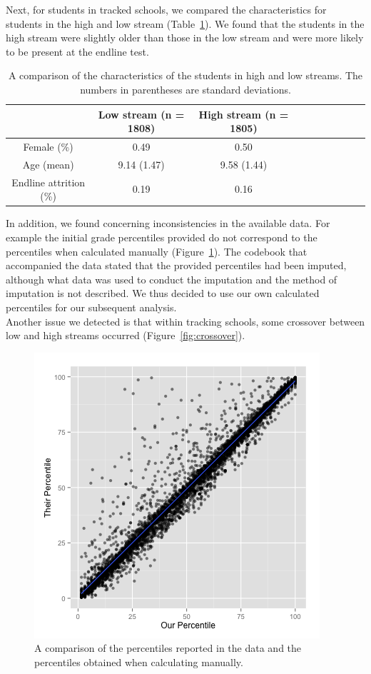 \documentclass[11pt]{article}
\begin{document}
 
 \noindent Next, for students in tracked schools, we compared the characteristics for students in the high and low stream (Table~\ref{tab:charstream}). We found that the students in the high stream were slightly older than those in the low stream and were more likely to be present at the endline test.
  \begin{table}[H]
 \centering
 \begin{tabular}{cccccccccc}
 \hline
 & Low stream (n = 1808) & High stream (n = 1805)\\
 \hline
Female (\%) & 0.49 & 0.50\\
Age (mean) & 9.14 (1.47) & 9.58 (1.44)\\
Endline attrition (\%) & 0.19 & 0.16\\ \hline
 \end{tabular}
 \caption{A comparison of the characteristics of the students in high and low streams. The numbers in parentheses are standard deviations.}
 \label{tab:charstream}
 \end{table} 
 
 
 \noindent In addition, we found concerning inconsistencies in the available data. For example the initial grade percentiles provided do not correspond to the percentiles when calculated manually (Figure~\ref{fig:percentile}). The codebook that accompanied the data stated that the provided percentiles had been imputed, although what data was used to conduct the imputation and the method of imputation is not described. We thus decided to use our own calculated percentiles for our subsequent analysis.\\
 
Another issue we detected is that within tracking schools, some crossover between low and high streams occurred (Figure~\ref{fig:crossover}).

 
 
  \begin{figure}[H]
 \centering
 \includegraphics[scale=0.6]{Score_vs_Percentile.png}
 \caption{A comparison of the percentiles reported in the data and the percentiles obtained when calculating manually.}
 \label{fig:percentile}
 \end{figure} 
 
\end{document}
